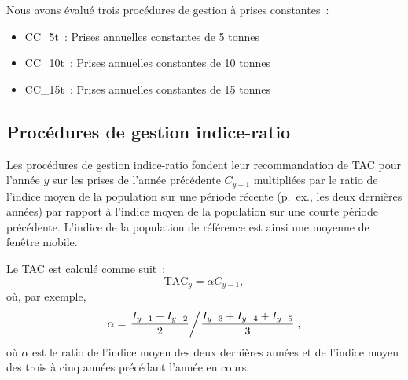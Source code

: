 \documentclass[french,11pt]{book}
\begin{document}
\hypertarget{sec:mp-cc}{%
\label{sec:mp-cc}}

Nous avons évalué trois procédures de gestion à prises constantes~:
\begin{itemize}

\item
  CC\_5t~: Prises annuelles constantes de 5 tonnes
\item
  CC\_10t~: Prises annuelles constantes de 10 tonnes
\item
  CC\_15t~: Prises annuelles constantes de 15 tonnes
\end{itemize}
\hypertarget{sec:mp-ibased}{%
\label{sec:mp-ibased}}

\hypertarget{sec:mp-iratio}{%
\subsection{Procédures de gestion indice-ratio}\label{sec:mp-iratio}}

Les procédures de gestion indice-ratio fondent leur recommandation de TAC pour l'année \(y\) sur les prises de l'année précédente \(C_{y-1}\) multipliées par le ratio de l'indice moyen de la population sur une période récente (p.~ex., les deux dernières années) par rapport à l'indice moyen de la population sur une courte période précédente. L'indice de la population de référence est ainsi une moyenne de fenêtre mobile.

Le TAC est calculé comme suit~:
\begin{equation}
\textrm{TAC}_y = \alpha C_{y-1},
\end{equation}
où, par exemple,
\begin{equation}
\alpha =
\left. \frac{I_{y-1} + I_{y-2}} {2} \middle/
\frac{I_{y-3} + I_{y-4} + I_{y-5}} {3} \right. ,
\end{equation}
où \(\alpha\) est le ratio de l'indice moyen des deux dernières années et de l'indice moyen des trois à cinq années précédant l'année en cours.
\end{document}
